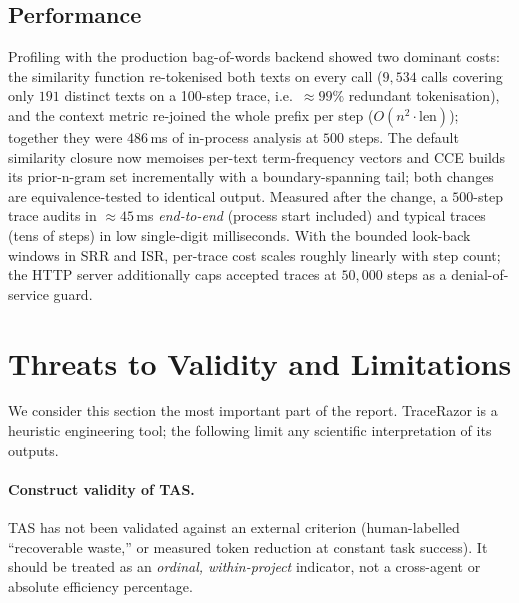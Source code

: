 \documentclass[11pt]{article}
\begin{document}
\subsection{Performance}
Profiling with the production bag-of-words backend showed two dominant costs:
the similarity function re-tokenised both texts on every call ($9{,}534$ calls
covering only $191$ distinct texts on a 100-step trace, i.e.\ $\approx 99\%$
redundant tokenisation), and the context metric re-joined the whole prefix per
step ($O(n^2 \cdot \mathrm{len})$); together they were $486$\,ms of in-process
analysis at $500$ steps. The default similarity closure now memoises per-text
term-frequency vectors and CCE builds its prior-n-gram set incrementally with a
boundary-spanning tail; both changes are equivalence-tested to identical
output. Measured after the change, a $500$-step trace audits in $\approx
45$\,ms \emph{end-to-end} (process start included) and typical traces (tens of
steps) in low single-digit milliseconds. With the bounded look-back windows in
SRR and ISR, per-trace cost scales roughly linearly with step count; the HTTP
server additionally caps accepted traces at $50{,}000$ steps as a
denial-of-service guard.

\section{Threats to Validity and Limitations}
\label{sec:limits}
We consider this section the most important part of the report. TraceRazor is a
heuristic engineering tool; the following limit any scientific interpretation of
its outputs.

\paragraph{Construct validity of TAS.} TAS has not been validated against an
external criterion (human-labelled ``recoverable waste,'' or measured token
reduction at constant task success). It should be treated as an \emph{ordinal,
within-project} indicator, not a cross-agent or absolute efficiency percentage.
\end{document}
